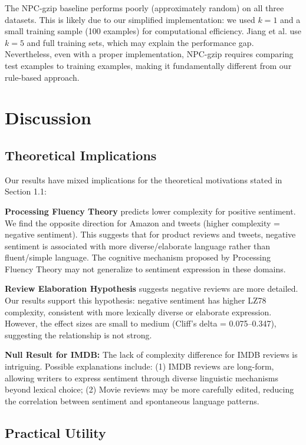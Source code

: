 \documentclass[11pt,letterpaper]{article}
\begin{document}
The NPC-gzip baseline \cite{Jiang2023} performs poorly (approximately random) on all three datasets. This is likely due to our simplified implementation: we used $k=1$ and a small training sample (100 examples) for computational efficiency. Jiang et al. \cite{Jiang2023} use $k=5$ and full training sets, which may explain the performance gap. Nevertheless, even with a proper implementation, NPC-gzip requires comparing test examples to training examples, making it fundamentally different from our rule-based approach.

\section{Discussion}

\subsection{Theoretical Implications}

Our results have mixed implications for the theoretical motivations stated in Section 1.1:

\textbf{Processing Fluency Theory} \cite{Reber2004} predicts lower complexity for positive sentiment. We find the opposite direction for Amazon and tweets (higher complexity = negative sentiment). This suggests that for product reviews and tweets, negative sentiment is associated with more diverse/elaborate language rather than fluent/simple language. The cognitive mechanism proposed by Processing Fluency Theory may not generalize to sentiment expression in these domains.

\textbf{Review Elaboration Hypothesis} suggests negative reviews are more detailed. Our results support this hypothesis: negative sentiment has higher LZ78 complexity, consistent with more lexically diverse or elaborate expression. However, the effect sizes are small to medium (Cliff's delta = 0.075--0.347), suggesting the relationship is not strong.

\textbf{Null Result for IMDB:} The lack of complexity difference for IMDB reviews is intriguing. Possible explanations include: (1) IMDB reviews are long-form, allowing writers to express sentiment through diverse linguistic mechanisms beyond lexical choice; (2) Movie reviews may be more carefully edited, reducing the correlation between sentiment and spontaneous language patterns.

\subsection{Practical Utility}
\end{document}
